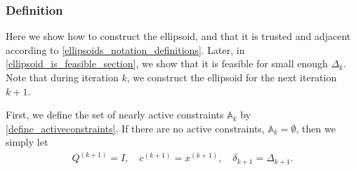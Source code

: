 \documentclass{article}
\theoremstyle{case}
\numberwithin{theorem}{subsection}
\newcommand{\activeconstraintsk}{{\mathbb A_{k}}}
\newcommand{\dk}{\Delta_k}
\newcommand{\dkpo}{\Delta_{k+1}}
\newcommand{\xkpo}{{{x}^{(k+1)}}}
\newcommand{\zik}{{z^{(i, k)}}}
\newcommand{\qkpo}{{Q^{(k+1)}}}
\newcommand{\ckpo}{{c^{(k+1)}}}
\newcommand{\sdkpo}{{\delta_{k+1}}}
\begin{document}
\subsubsection{Definition}

Here we show how to construct the ellipsoid, and that it is 
trusted and adjacent
according to \cref{ellipsoids_notation_definitions}.
Later, in \cref{ellipsoid_is_feasible_section}, we show that it is feasible for small enough $\dk$.
Note that during iteration $k$, we construct the ellipsoid for the next iteration $k+1$.


First, we define the set of nearly active constraints $\activeconstraintsk$ by \cref{define_activeconstraints}.
If there are no active constraints, $\activeconstraintsk = \emptyset$, then we simply let
\begin{align}
\qkpo = I, \quad \ckpo = \xkpo, \quad \sdkpo = \dkpo. \label{define_trivial_ellipsek}
\end{align}
\end{document}
